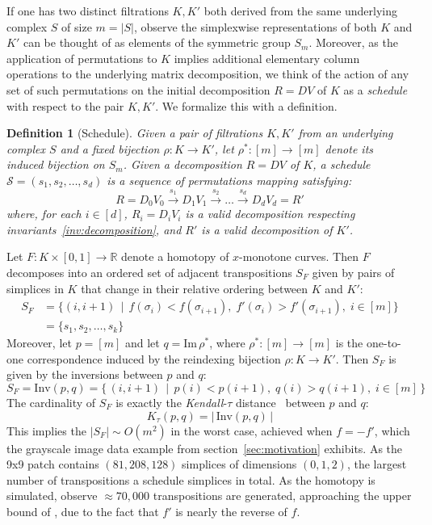 \documentclass[sn-mathphys]{sn-jnl}
\newtheorem{definition}{Definition}
\begin{document}
If one has two distinct filtrations $K,K'$ both derived from the same underlying complex $S$ of size $m = \lvert S \rvert$, observe the simplexwise representations of both $K$ and $K'$ can be thought of as elements of the symmetric group $S_m$.
Moreover, as the application of permutations to $K$ implies additional elementary column operations to the underlying matrix decomposition, we think of the action of any set of such permutations on the initial decomposition $R=DV$ of $K$ as a \emph{schedule} with respect to the pair $K,K'$. We formalize this with a definition.
\begin{definition}[Schedule]\label{def:schedule}
Given a pair of filtrations $K, K'$ from an underlying complex $S$ and a fixed bijection $\rho : K \to K'$, let $\rho^\ast : [m] \to [m]$ denote its induced bijection on $S_m$. Given a decomposition $R = DV$ of $K$, a \emph{schedule}  $\mathcal{S} = (s_1, s_2, \dots, s_d )$ is a sequence of permutations mapping satisfying: 
	\begin{equation}\label{eq:rv_seq}
   		R = D_0 V_0 \overset{s_1}{\to} D_1 V_{1} \overset{s_2}{\to} \dots \overset{s_d}{\to} D_d V_{d} = R'
   	\end{equation}
   	where, for each $i \in [d]$, $R_i = D_i V_i$ is a valid decomposition respecting invariants~\ref{inv:decomposition}, and $R'$ is a valid decomposition of $K'$.
\end{definition}
\noindent Let $F : K \times [0,1] \to \mathbb{R}$ denote a homotopy of $x$-monotone curves. Then  $F$ decomposes into an ordered set of adjacent transpositions $S_F$ given by pairs of simplices in $K$ that change in their relative ordering between $K$ and $K'$:
\begin{align*}\label{eq:sf_schedule}
	S_F &= \{ (i,i+1) \, \mid \, f(\sigma_i) < f(\sigma_{i+1}), \;  f'(\sigma_i) > f'(\sigma_{i+1}), \; i \in [m] \} \\
	&= \{ s_1, s_2, \dots, s_k \} 
\end{align*}
Moreover, let $p = [m]$ and let $q = \mathrm{Im}\,\rho^\ast$, where $\rho^\ast : [m] \to [m]$ is the one-to-one correspondence induced by the reindexing bijection $\rho: K \to K'$. Then $S_F$ is given by the inversions between $p$ and $q$:
\[S_F = 
\mathrm{Inv}(p, q) = \{ \, (i,i+1) \, \mid \, p(i) < p(i+1), \; q(i) > q(i+1), \; i \in [m]\, \}
\]
The cardinality of $  S_F $ is exactly the \emph{Kendall}-$\tau$ distance~\cite{diaconis1977spearman} between $p$ and $q$: 
\begin{equation}\label{eq:kendall_dist}
	K_\tau(p, q) = \lvert \, \mathrm{Inv}(p, q) \, \rvert
\end{equation}
This implies the $\lvert S_F \rvert \sim O(m^2)$ in the worst case, achieved when $f = - f'$, which the grayscale image data example from section~\ref{sec:motivation} exhibits. 
As the 9x9 patch contains $(81, 208, 128)$ simplices of dimensions $(0, 1, 2)$, the largest number of transpositions a schedule simplices in total. As the homotopy is simulated, observe $\approx 70,\!000$ transpositions are generated, approaching the upper bound of , due to the fact that $f'$  is nearly the reverse of $f$.   
\end{document}
